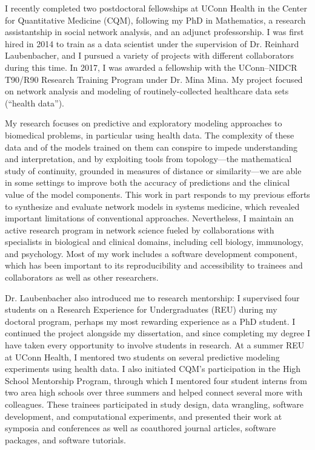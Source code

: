 \documentclass{nihbiosketch}
\begin{document}
\begin{statement}

I recently completed two postdoctoral fellowships at UConn Health in the Center for Quantitative Medicine (CQM), following my PhD in Mathematics, a research assistantship in social network analysis, and an adjunct professorship.
I was first hired in 2014 to train as a data scientist under the supervision of Dr. Reinhard Laubenbacher, and I pursued a variety of projects with different collaborators during this time.
In 2017, I was awarded a fellowship with the UConn--NIDCR T90/R90 Research Training Program under Dr. Mina Mina. My project focused on network analysis and modeling of routinely-collected healthcare data sets (``health data'').

My research focuses on predictive and exploratory modeling approaches to biomedical problems, in particular using health data. The complexity of these data and of the models trained on them  can conspire to impede understanding and interpretation, and by exploiting tools from topology---the mathematical study of continuity, grounded in measures of distance or similarity---we are able in some settings to improve both the accuracy of predictions and the clinical value of the model components. This work in part responds to my previous efforts to synthesize and evaluate network models in systems medicine, which revealed important limitations of conventional approaches.
Nevertheless, I maintain an active research program in network science fueled by collaborations with specialists in biological and clinical domains, including cell biology, immunology, and psychology.
Most of my work includes a software development component, which has been important to its reproducibility and accessibility to trainees and collaborators as well as other researchers.

Dr. Laubenbacher also introduced me to research mentorship: I supervised four students on a Research Experience for Undergraduates (REU) during my doctoral program, perhaps my most rewarding experience as a PhD student. I continued the project alongside my dissertation, and since completing my degree I have taken every opportunity to involve students in research. At a summer REU at UConn Health, I mentored two students on several predictive modeling experiments using health data. I also initiated CQM's participation in the High School Mentorship Program, through which I mentored four student interns from two area high schools over three summers and helped connect several more with colleagues. These trainees participated in study design, data wrangling, software development, and computational experiments, and presented their work at symposia and conferences as well as coauthored journal articles, software packages, and software tutorials.


\end{statement}
\end{document}

